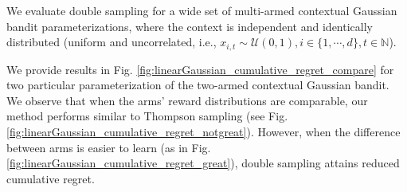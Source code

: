 \documentclass[10pt]{article}
\def \Natural{{\mathbb N}}
\newcommand{\ie}{i.e., }
\newcommand{\U}{\mathcal{U}}
\begin{document}
We evaluate double sampling for a wide set of multi-armed contextual Gaussian bandit parameterizations, where the context is independent and identically distributed (uniform and uncorrelated, \ie $x_{i,t}\sim \U(0,1), i \in \{1, \cdots, d\}, t \in \Natural$).

We provide results in Fig. \ref{fig:linearGaussian_cumulative_regret_compare} for two particular parameterization of the two-armed contextual Gaussian bandit. We observe that when the arms' reward distributions are comparable, our method performs similar to Thompson sampling (see Fig. \ref{fig:linearGaussian_cumulative_regret_notgreat}). However, when the difference between arms is easier to learn (as in Fig. \ref{fig:linearGaussian_cumulative_regret_great}), double sampling attains reduced cumulative regret.

\end{document}
